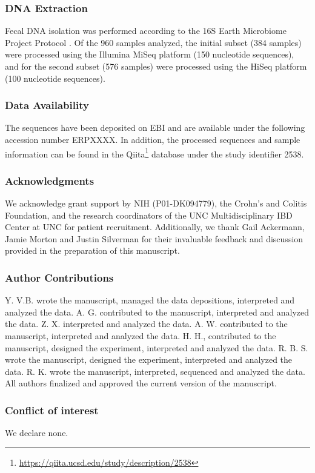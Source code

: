 \subsubsection{DNA Extraction}

Fecal DNA isolation was performed according to the 16S Earth Microbiome Project Protocol \cite{RN164}. Of the 960 samples analyzed, the initial subset (384 samples)  were processed using the Illumina MiSeq platform (150 nucleotide sequences), and for the second subset (576 samples) were processed using the HiSeq platform (100 nucleotide sequences).

\subsubsection{Data Availability}

The sequences have been deposited on EBI and are available under the following accession number ERPXXXX.  In addition, the processed sequences and sample information can be found in the Qiita\footnote{\url{https://qiita.ucsd.edu/study/description/2538}} database under the study identifier 2538.


\subsubsection{Acknowledgments}
We acknowledge grant support by NIH (P01-DK094779), the Crohn's and Colitis Foundation, and the research coordinators of the UNC Multidisciplinary IBD Center at UNC for patient recruitment. Additionally, we thank Gail Ackermann, Jamie Morton and Justin Silverman for their invaluable feedback and discussion provided in the preparation of this manuscript.

\subsubsection{Author Contributions}

Y. V.B. wrote the manuscript, managed the data depositions, interpreted and analyzed the data. A. G. contributed to the manuscript, interpreted and analyzed the data. Z. X. interpreted and analyzed the data. A. W. contributed to the manuscript, interpreted and analyzed the data. H. H., contributed to the manuscript, designed the experiment, interpreted and analyzed the data. R. B. S. wrote the manuscript, designed the experiment, interpreted and analyzed the data. R. K. wrote the manuscript, interpreted, sequenced and analyzed the data. All authors finalized and approved the current version of the manuscript.

\subsubsection{Conflict of interest}
We declare none.
